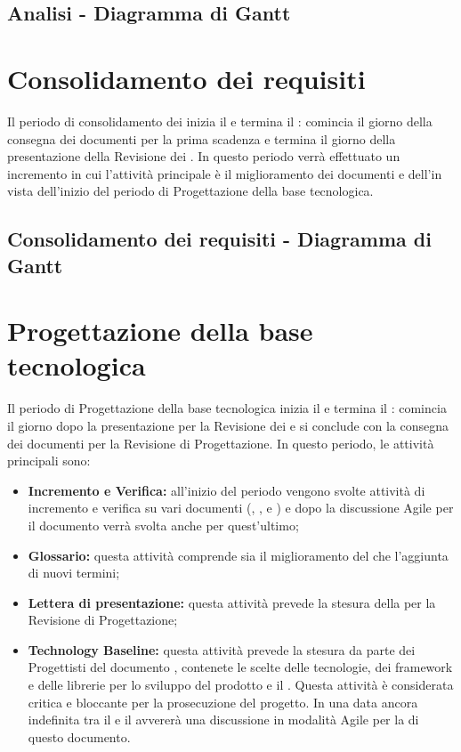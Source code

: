 \documentclass[PianoDiProgetto.tex]{subfiles}
\begin{document}
\begin{landscape}
\subsection{Analisi - Diagramma di Gantt}
\end{landscape}	
\section{Consolidamento dei requisiti}
Il periodo di consolidamento dei  inizia il  e termina il : comincia il giorno della consegna dei documenti per la prima scadenza e termina il giorno della presentazione della Revisione dei . In questo periodo verrà effettuato un incremento in cui l'attività principale è il miglioramento dei documenti e dell'\adr in vista dell'inizio del periodo di Progettazione della base tecnologica.
\subsection{Consolidamento dei requisiti - Diagramma di Gantt}

\newpage

\section{Progettazione della base tecnologica}
Il periodo di Progettazione della base tecnologica inizia il  e termina il : comincia il giorno dopo la presentazione per la Revisione dei  e si conclude con la consegna dei documenti per la Revisione di Progettazione. In questo periodo, le attività principali sono:

\begin{itemize}
	\item \textbf{Incremento e Verifica:} all'inizio del periodo vengono svolte attività di incremento e verifica su vari documenti (\ndp, \pdp, \pdq e \adr) e dopo la discussione Agile per il documento \tb verrà svolta anche per quest'ultimo;
	\item \textbf{Glossario:} questa attività comprende sia il miglioramento del \g che l'aggiunta di nuovi termini;
	\item \textbf{Lettera di presentazione:} questa attività prevede la stesura della  per la Revisione di Progettazione;
	\item \textbf{Technology Baseline:} questa attività prevede la stesura da parte dei Progettisti del documento \tb, contenete le scelte delle tecnologie, dei framework e delle librerie per lo sviluppo del prodotto e il . Questa attività è considerata critica e bloccante per la prosecuzione del progetto. In una data ancora indefinita tra il  e il  avvererà una discussione in modalità Agile per la  di questo documento.
\end{itemize}
\end{document}

